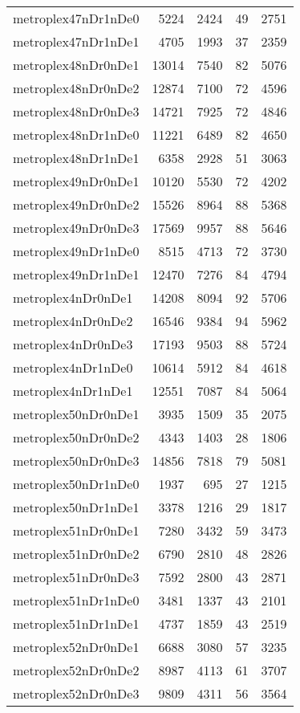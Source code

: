 \begin{longtable}{lrrrr}
metroplex47nDr1nDe0 & 5224 & 2424 & 49 & 2751 \\
metroplex47nDr1nDe1 & 4705 & 1993 & 37 & 2359 \\
metroplex48nDr0nDe1 & 13014 & 7540 & 82 & 5076 \\
metroplex48nDr0nDe2 & 12874 & 7100 & 72 & 4596 \\
metroplex48nDr0nDe3 & 14721 & 7925 & 72 & 4846 \\
metroplex48nDr1nDe0 & 11221 & 6489 & 82 & 4650 \\
metroplex48nDr1nDe1 & 6358 & 2928 & 51 & 3063 \\
metroplex49nDr0nDe1 & 10120 & 5530 & 72 & 4202 \\
metroplex49nDr0nDe2 & 15526 & 8964 & 88 & 5368 \\
metroplex49nDr0nDe3 & 17569 & 9957 & 88 & 5646 \\
metroplex49nDr1nDe0 & 8515 & 4713 & 72 & 3730 \\
metroplex49nDr1nDe1 & 12470 & 7276 & 84 & 4794 \\
metroplex4nDr0nDe1 & 14208 & 8094 & 92 & 5706 \\
metroplex4nDr0nDe2 & 16546 & 9384 & 94 & 5962 \\
metroplex4nDr0nDe3 & 17193 & 9503 & 88 & 5724 \\
metroplex4nDr1nDe0 & 10614 & 5912 & 84 & 4618 \\
metroplex4nDr1nDe1 & 12551 & 7087 & 84 & 5064 \\
metroplex50nDr0nDe1 & 3935 & 1509 & 35 & 2075 \\
metroplex50nDr0nDe2 & 4343 & 1403 & 28 & 1806 \\
metroplex50nDr0nDe3 & 14856 & 7818 & 79 & 5081 \\
metroplex50nDr1nDe0 & 1937 & 695 & 27 & 1215 \\
metroplex50nDr1nDe1 & 3378 & 1216 & 29 & 1817 \\
metroplex51nDr0nDe1 & 7280 & 3432 & 59 & 3473 \\
metroplex51nDr0nDe2 & 6790 & 2810 & 48 & 2826 \\
metroplex51nDr0nDe3 & 7592 & 2800 & 43 & 2871 \\
metroplex51nDr1nDe0 & 3481 & 1337 & 43 & 2101 \\
metroplex51nDr1nDe1 & 4737 & 1859 & 43 & 2519 \\
metroplex52nDr0nDe1 & 6688 & 3080 & 57 & 3235 \\
metroplex52nDr0nDe2 & 8987 & 4113 & 61 & 3707 \\
metroplex52nDr0nDe3 & 9809 & 4311 & 56 & 3564 \\

\end{longtable}
